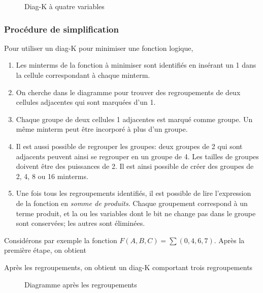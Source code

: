 \documentclass[11pt]{article}
\begin{document}
\begin{figure}[htbp]
\centering

\caption{\label{fig:orgf9169a4}Diag-K à quatre variables}
\end{figure}

\subsubsection{Procédure de simplification}
\label{sec:org76bc380}

Pour utiliser un diag-K pour minimiser une fonction logique, 

\begin{enumerate}
\item Les minterms de la fonction à minimiser sont identifiés en insérant
un 1 dans la cellule correspondant à chaque minterm.
\item On cherche dans le diagramme pour trouver des regroupements de deux
cellules adjacentes qui sont marquées d'un 1.
\item Chaque groupe de deux cellules 1 adjacentes est marqué comme
groupe. Un même minterm peut être incorporé à plus d'un groupe.
\item Il est aussi possible de regrouper les groupes: deux groupes de 2
qui sont adjacents peuvent ainsi se regrouper en un groupe
de 4. Les tailles de groupes doivent être des puissances de 2. Il
est ainsi possible de créer des groupes de 2, 4, 8 ou 16 minterms.
\item Une fois tous les regroupements identifiés, il est possible de lire
l'expression de la fonction en \emph{somme de produits}. Chaque groupement
correspond à un terme produit, et la ou les variables dont le bit ne
change pas dans le groupe sont conservées; les autres sont
éliminées.
\end{enumerate}

Considérons par exemple la fonction \(F(A,B,C) = \sum (0, 4, 6,
7)\). Après la première étape, on obtient

\begin{center}

\label{orgbfcc607}
\end{center}

Après les regroupements, on obtient un diag-K comportant trois regroupements

\begin{figure}[htbp]
\centering

\caption{\label{fig:org0da9dd6}Diagramme après les regroupements}
\end{figure}
\end{document}
